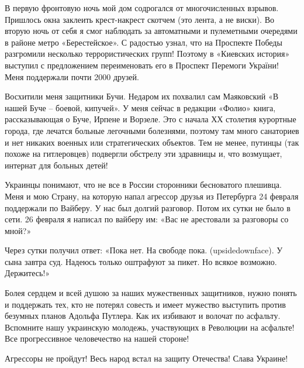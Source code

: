 В первую фронтовую ночь мой дом содрогался от многочисленных взрывов. Пришлось
окна заклеить крест-накрест скотчем (это лента, а не виски). Во вторую ночь от
себя я смог наблюдать за автоматными и пулеметными очередями в районе метро
«Берестейское». С радостью узнал, что на Проспекте Победы разгромили несколько
террористических групп! Поэтому в «Киевских история» выступил с предложением
переименовать его в Проспект Перемоги України! Меня поддержали почти 2000
друзей.

Восхитили меня защитники Бучи. Недаром их похвалил сам Маяковский «В нашей Буче
– боевой, кипучей». У меня сейчас в редакции «Фолио» книга, рассказывающая о
Буче, Ирпене и Ворзеле. Это с начала ХХ столетия курортные города, где лечатся
больные легочными болезнями, поэтому там много санаториев и нет никаких военных
или стратегических объектов. Тем не менее, путинцы (так похоже на гитлеровцев)
подвергли обстрелу эти здравницы и, что возмущает, интернат для больных детей!

Украинцы понимают, что не все в России сторонники бесноватого плешивца. Меня и
мою Страну, на которую напал агрессор друзья из Петербурга 24 февраля
поддержали по Вайберу. У нас был долгий разговор. Потом их сутки не было в
сети. 26 февраля я написал по вайберу им: «Вас не арестовали за разговоры со
мной?»

Через сутки получил ответ: «Пока нет. На свободе пока. (upsidedownface). У сына
завтра суд. Надеюсь только оштрафуют за пикет. Но всякое возможно. Держитесь!»

Болея сердцем и всей душою за наших мужественных защитников, нужно понять и
поддержать тех, кто не потерял совесть и имеет мужество выступить против
безумных планов Адольфа Путлера. Как их избивают и волочат по асфальту.
Вспомните нашу украинскую молодежь, участвующих в Революции на асфальте! Все
прогрессивное человечество на нашей стороне!

Агрессоры не пройдут! Весь народ встал на защиту Отечества! Слава Украине!
